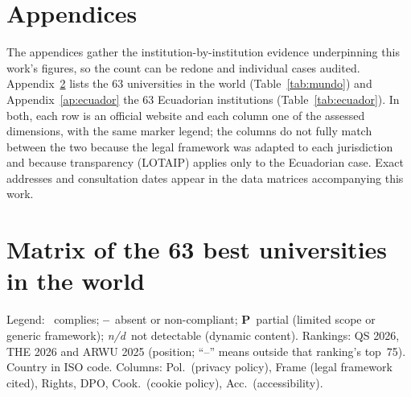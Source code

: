 \documentclass[pdflatex,sn-basic,Numbered]{sn-jnl}
\newcommand{\si}{\ding{51}}
\newcommand{\no}{\textcolor{gris}{\textbf{--}}}
\newcommand{\nd}{\textsl{\footnotesize n/d}}
\theoremstyle{thmstyleone}
\theoremstyle{thmstyletwo}
\theoremstyle{thmstylethree}
\begin{document}
\begin{appendices}
\section{Appendices}
The appendices gather the institution-by-institution evidence underpinning this work's figures, so the count can be redone and individual cases audited. Appendix~\ref{ap:mundo} lists the 63 universities in the world (Table~\ref{tab:mundo}) and Appendix~\ref{ap:ecuador} the 63 Ecuadorian institutions (Table~\ref{tab:ecuador}). In both, each row is an official website and each column one of the assessed dimensions, with the same marker legend; the columns do not fully match between the two because the legal framework was adapted to each jurisdiction and because transparency (LOTAIP) applies only to the Ecuadorian case. Exact addresses and consultation dates appear in the data matrices accompanying this work.

\section{Matrix of the 63 best universities in the world}\label{ap:mundo}
Legend: \si~complies; \no~absent or non-compliant; \textbf{P}~partial (limited scope or generic framework); \nd~not detectable (dynamic content). Rankings: QS 2026, THE 2026 and ARWU 2025 (position; ``--'' means outside that ranking's top~75). Country in ISO code. Columns: Pol.\ (privacy policy), Frame (legal framework cited), Rights, DPO, Cook.\ (cookie policy), Acc.\ (accessibility).


\end{appendices}
\end{document}
